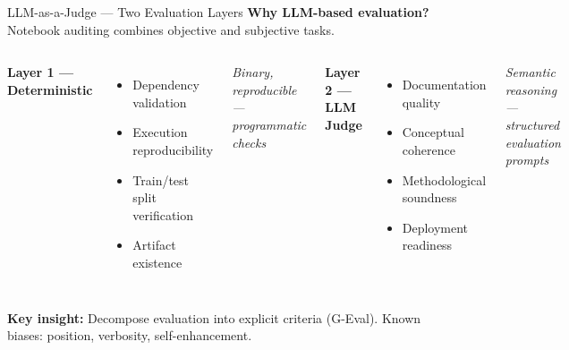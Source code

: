 \documentclass[11pt, aspectratio=169]{beamer}
\begin{document}
\begin{frame}{LLM-as-a-Judge --- Two Evaluation Layers}
  \textbf{Why LLM-based evaluation?} Notebook auditing combines \alert{objective} and
  \alert{subjective} tasks.

  \vspace{0.25cm}
  \begin{columns}[T]
      \textbf{Layer 1 --- Deterministic}
      \begin{itemize}\small
        \item Dependency validation
        \item Execution reproducibility
        \item Train/test split verification
        \item Artifact existence
      \end{itemize}
      \vspace{0.1cm}
      {\small\textit{Binary, reproducible --- programmatic checks}}

      \textbf{Layer 2 --- LLM Judge}
      \begin{itemize}\small
        \item Documentation quality
        \item Conceptual coherence
        \item Methodological soundness
        \item Deployment readiness
      \end{itemize}
      \vspace{0.1cm}
      {\small\textit{Semantic reasoning --- structured evaluation prompts}}
  \end{columns}

  \vspace{0.3cm}
  \textbf{Key insight:} Decompose evaluation into explicit criteria (G-Eval).
  Known biases: position, verbosity, self-enhancement.
\end{frame}
\end{document}
